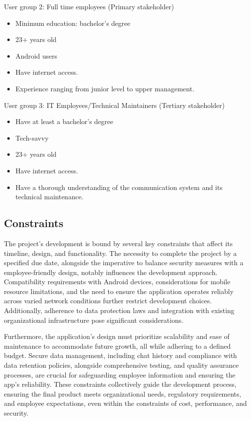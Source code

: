 \documentclass[]{article}
\begin{document}
\noindent User group 2: Full time employees (Primary stakeholder)
\begin{itemize}
    \item Minimum education: bachelor’s degree
    \item 23+ years old
    \item Android users
    \item Have internet access.
    \item Experience ranging from junior level to upper management.
\end{itemize}

\noindent User group 3: IT Employees/Technical Maintainers (Tertiary stakeholder)
\begin{itemize}
    \item Have at least a bachelor’s degree
    \item Tech-savvy
    \item 23+ years old
    \item Have internet access.
    \item Have a thorough understanding of the communication system and its technical maintenance.
\end{itemize}

\subsection{Constraints}
\label{sub:constraints}
\hspace{5mm}The project's development is bound by several key constraints that affect its timeline, design, and functionality. The necessity to complete the project by a specified due date, alongside the imperative to balance security measures with a employee-friendly design, notably influences the development approach. Compatibility requirements with Android devices, considerations for mobile resource limitations, and the need to ensure the application operates reliably across varied network conditions further restrict development choices. Additionally, adherence to data protection laws and integration with existing organizational infrastructure pose significant considerations.

Furthermore, the application's design must prioritize scalability and ease of maintenance to accommodate future growth, all while adhering to a defined budget. Secure data management, including chat history and compliance with data retention policies, alongside comprehensive testing, and quality assurance processes, are crucial for safeguarding employee information and ensuring the app's reliability. These constraints collectively guide the development process, ensuring the final product meets organizational needs, regulatory requirements, and employee expectations, even within the constraints of cost, performance, and security.
\end{document}
